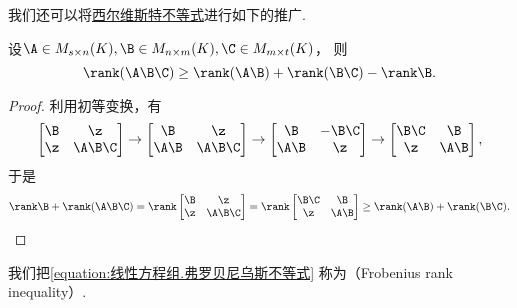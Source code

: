我们还可以将\hyperref[equation:线性方程组.西尔维斯特不等式]{西尔维斯特不等式}进行如下的推广.
\begin{theorem}
设\(\A \in M_{s \times n}(K),
\B \in M_{n \times m}(K),
\C \in M_{m \times t}(K)\)，
则\begin{equation}\label{equation:线性方程组.弗罗贝尼乌斯不等式}
	\rank(\A\B\C) \geq \rank(\A\B) + \rank(\B\C) - \rank\B.
\end{equation}
\begin{proof}
利用初等变换，有\[
	\begin{bmatrix}
		\B & \z \\
		\z & \A\B\C
	\end{bmatrix}
	\to \begin{bmatrix}
		\B & \z \\
		\A\B & \A\B\C
	\end{bmatrix}
	\to \begin{bmatrix}
		\B & -\B\C \\
		\A\B & \z
	\end{bmatrix}
	\to \begin{bmatrix}
		\B\C & \B \\
		\z & \A\B
	\end{bmatrix},
\]
于是\[
	\rank\B + \rank(\A\B\C)
	= \rank\begin{bmatrix}
		\B & \z \\
		\z & \A\B\C
	\end{bmatrix}
	= \rank\begin{bmatrix}
		\B\C & \B \\
		\z & \A\B
	\end{bmatrix}
	\geq \rank(\A\B) + \rank(\B\C).
	\qedhere
\]
\end{proof}
\end{theorem}

我们把\cref{equation:线性方程组.弗罗贝尼乌斯不等式}
称为（Frobenius rank inequality）.


